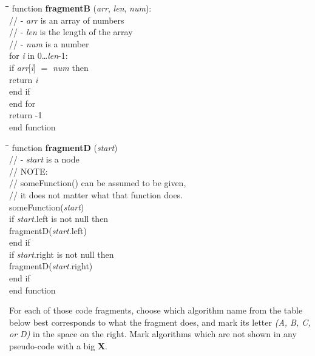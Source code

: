 \documentclass[a4paper]{article}
\begin{document}
\hfill%
\begin{minipage}[t]{0.44\columnwidth}
  
  \begin{tabbing}
    \quad\=\quad\=\quad\=\quad\=\quad\=\kill
    function \textbf{fragmentB} (\emph{arr}, \emph{len}, \emph{num}):\\
    \>// - \emph{arr} is an array of numbers\\
    \>// - \emph{len} is the length of the array\\
    \>// - \emph{num} is a number\\
    \>for \emph{i} in 0\ldots\emph{len}-1:\\
    \>\>if \emph{arr}[\emph{i}] $=$ \emph{num} then\\
    \>\>\>return \emph{i}\\
    \>\>end if\\
    \>end for\\
    \>return -1\\
    end function
  \end{tabbing}
  
  \begin{tabbing}
    \quad\=\quad\=\quad\=\quad\=\quad\=\kill
    function \textbf{fragmentD} (\emph{start})\\
    \>// - \emph{start} is a node\\
    \>// NOTE:\\
    \>// \quad someFunction() can be assumed to be given,\\
    \>// \quad it does not matter what that function does.\\
    \>someFunction(\emph{start})\\
    \>if \emph{start}.left is not null then\\
    \>\>fragmentD(\emph{start}.left)\\
    \>end if\\
    \>if \emph{start}.right is not null then\\
    \>\>fragmentD(\emph{start}.right)\\
    \>end if\\
    end function
  \end{tabbing}
\end{minipage}
\normalsize
\vspace{\baselineskip}

For each of those code fragments, choose which algorithm name from the table below best corresponds to what the fragment does, and mark its letter \emph{(A, B, C, or D)} in the space on the right.
Mark algorithms which are not shown in any pseudo-code with a big \textbf{X}.
\end{document}
